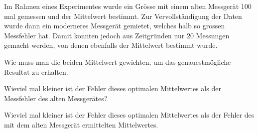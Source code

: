 Im Rahmen eines Experimentes wurde ein Grösse mit einem alten Messgerät
100 mal gemessen und der Mittelwert bestimmt.
Zur Vervollständigung der Daten wurde dann ein moderneres Messgerät
gemietet, welches halb so grossen Messfehler hat.
Damit konnten jedoch aus Zeitgründen nur 20 Messungen gemacht werden,
von denen ebenfalls der Mittelwert bestimmt wurde.
\begin{teilaufgaben}
\item
Wie muss man die beiden Mittelwert gewichten, um das genauestmögliche
Resultat zu erhalten.
\item
Wieviel mal kleiner ist der Fehler dieses optimalen Mittelwertes als 
der Messfehler des alten Messgerätes?
\item
Wieviel mal kleiner ist der Fehler dieses optimalen Mittelwertes als
der Fehler des mit dem alten Messgerät ermittelten Mittelwertes.
\end{teilaufgaben}

